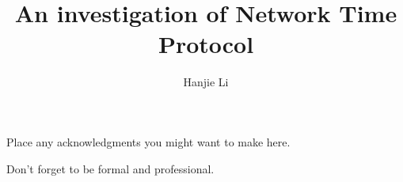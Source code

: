 

\title{An investigation of Network Time Protocol}
\author{Hanjie Li}







\firstThreePages


\Acknowledgments

Place any acknowledgments you might want to make here.

\noindent
Don't forget to be formal and professional.



\tocAndSuch

